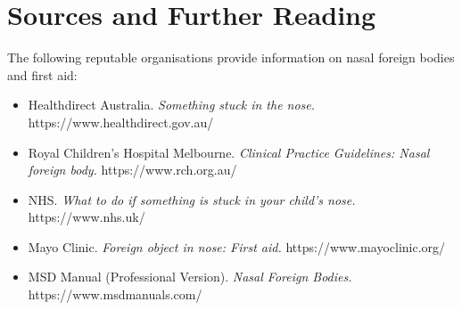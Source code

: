 \section*{Sources and Further Reading}
The following reputable organisations provide information on nasal foreign bodies and first aid:
\begin{itemize}
    \item Healthdirect Australia. \textit{Something stuck in the nose.} https://www.healthdirect.gov.au/
    \item Royal Children's Hospital Melbourne. \textit{Clinical Practice Guidelines: Nasal foreign body.} https://www.rch.org.au/
    \item NHS. \textit{What to do if something is stuck in your child's nose.} https://www.nhs.uk/
    \item Mayo Clinic. \textit{Foreign object in nose: First aid.} https://www.mayoclinic.org/
    \item MSD Manual (Professional Version). \textit{Nasal Foreign Bodies.} https://www.msdmanuals.com/
\end{itemize}
